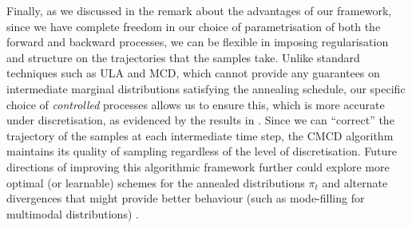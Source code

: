Finally, as we discussed in the remark about the advantages of our framework, since we have complete freedom in our choice of parametrisation of both the forward and backward processes, we can be flexible in imposing regularisation and structure on the trajectories that the samples take. Unlike standard techniques such as ULA and MCD, which cannot provide any guarantees on intermediate marginal distributions satisfying the annealing schedule, our specific choice of \textit{controlled} processes allows us to ensure this, which is more accurate under discretisation, as evidenced by the results in . Since we can ``correct'' the trajectory of the samples at each intermediate time step, the CMCD algorithm maintains its quality of sampling regardless of the level of discretisation. Future directions of improving this algorithmic framework further could explore more optimal (or learnable) schemes for the annealed distributions $\pi_t$ \parencite{goshtasbpour2023adaptive} and alternate divergences that might provide better behaviour (such as mode-filling for multimodal distributions) \parencite{nusken2021solving, richter2023improved, midgley2022flow}. 



    
    

